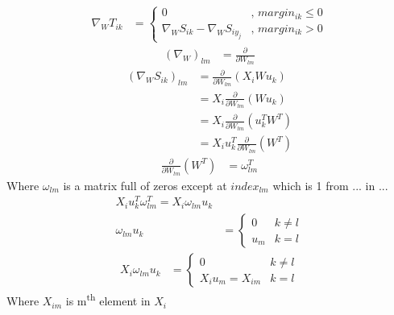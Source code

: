 \documentclass[]{article}
\begin{document}
\begin{align}
	\nabla_W T_{ik}	&= \begin{cases}
	0 & \text{, $margin_{ik} \le 0$} \\
	\nabla_W S_{ik} - \nabla_W S_{i y_j} & \text{, $margin_{ik} > 0$}
	\end{cases}
\end{align}
\begin{align}
	{\left( \nabla_W \right)}_{lm} &= \frac{ \partial }{\partial W_{lm}}
\end{align}
\begin{align}
	{\left( \nabla_W S_{ik} \right)}_{lm} &= \frac{ \partial }{\partial W_{lm}} \left( X_i W u_k\right) \nonumber  \\
	&= X_i \frac{\partial}{\partial W_{lm}} \left( W u_k \right) \nonumber \\
	&= X_i \frac{\partial}{\partial W_{lm}} \left( u^T_k W^T \right) \nonumber \\
	&= X_i u^T_k \frac{\partial}{\partial W_{lm}} \left(  W^T \right)
\end{align}
\begin{align}
	\frac{\partial}{\partial W_{lm}} \left(  W^T \right) &= \omega^{T}_{lm}
\end{align}
Where $\omega_{lm}$ is a matrix full of zeros except at $index_{lm}$ which is 1
from ... in ...
\begin{align}
X_i u^T_k \omega^T_{lm} = X_i \omega_{lm} u_k \\
\omega_{lm} u_k &= \begin{cases}
0 & k \ne l \\
u_m & k = l
\end{cases}
\end{align}
\begin{align}
X_i \omega_{lm} u_k &= \begin{cases}
0 & k \ne l \\
X_i u_m = X_{im} & k = l
\end{cases}
\end{align} 
Where $X_{im}$ is m\textsuperscript{th} element in $X_i$
\end{document}
